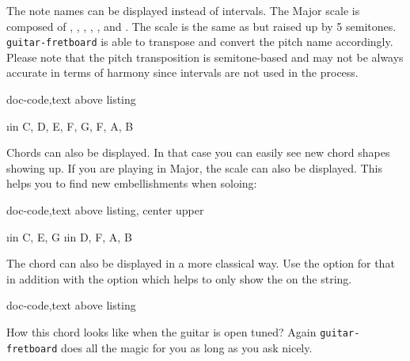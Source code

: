 \documentclass[a4paper]{article}
\newcommand{\pkg}[1]{\texttt{#1}}
\begin{document}
The note names can be displayed instead of intervals. The \pF Major scale is
composed of \pF, \pG, \pA, \pBb, \pC, \pD and \pE. The \pF scale is the same
as \pC but raised up by 5 semitones. \pkg{guitar-fretboard} is able to
transpose and convert the pitch name accordingly. Please note that the pitch
transposition is semitone-based and may not be always accurate in terms of
harmony since intervals are not used in the process.

\begin{tcblisting}{doc-code,text above listing}
  \begin{fb}[frets before = 2, frets after = 2,
      transpose = 5,
      transpose pitch,
      legend = {\pF Major scale\\\Large (\pF, \pG, \pA, \pBb, \pC, \pD, \pE)},
      scale=0.35,
      fret numbers]
    \foreach \i in { C, D, E, F, G, F, A, B} {
      \note[split]{\i}
    }
  \end{fb}
\end{tcblisting}



Chords can also be displayed. In that case you can easily see new \pC chord
shapes showing up. If you are playing in \pC Major, the scale can also be
displayed. This helps you to find new embellishments when soloing:

\begin{tcblisting}{doc-code,text above listing, center upper}
  \begin{fb}[frets before = 2, frets after = 2,
      legend = {\pC Chord (and \pC major scale)},
      scale = 0.35,
      fret numbers]
    \foreach \i in {C, E, G} {
      \note{\i}
    }
    \foreach \i in {D, F, A, B} {
      \note[shade]{\i}
    }
  \end{fb}
\end{tcblisting}

The \pC chord can also be displayed in a more classical way. Use the
 option for that in addition with the  option which
helps to only show the \pG on the  string.

\begin{tcblisting}{doc-code,text above listing}
  \begin{fb}[frets min = 0, frets max = 3, fret numbers,
      legend = {\pC}, chord, scale=0.35]
      
  \end{fb}
\end{tcblisting}

How this \pC chord looks like when the guitar is open \pG tuned? Again
\pkg{guitar-fretboard} does all the magic for you as long as you ask nicely.
\end{document}
